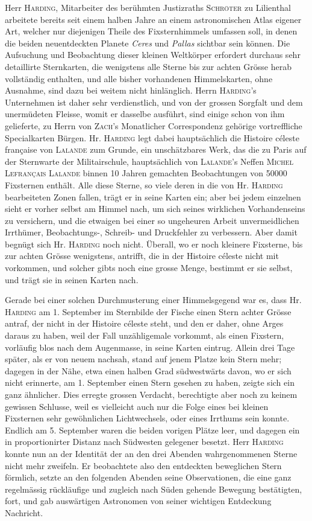 Herr \textsc{Harding}, Mitarbeiter des berühmten Justizraths \textsc{Schröter} zu Lilienthal arbeitete bereits seit einem halben Jahre an einem astronomischen Atlas eigener Art, welcher nur diejenigen Theile des Fixsternhimmels umfassen soll, in denen die beiden neuentdeckten Planete \emph{Ceres} und \emph{Pallas} sichtbar sein können. Die Aufsuchung und Beobachtung dieser kleinen Weltkörper erfordert durchaus sehr detaillirte Sternkarten, die wenigstens alle Sterne bis zur achten Grösse herab vollständig enthalten, und alle bisher vorhandenen Himmelskarten, ohne Ausnahme, sind dazu bei weitem nicht hinlänglich. Herrn \textsc{Harding}'s Unternehmen ist daher sehr verdienstlich, und von der grossen Sorgfalt und dem unermüdeten Fleisse, womit er dasselbe ausführt, sind einige schon von ihm gelieferte, zu Herrn von \textsc{Zach}'s Monatlicher Correspondenz gehörige vortreffliche Specialkarten Bürgen. Hr. \textsc{Harding} legt dabei hauptsächlich die Histoire céleste française von \textsc{Lalande} zum Grunde, ein unschätzbares Werk, das die zu Paris auf der Sternwarte der Militairschule,
 hauptsächlich von \textsc{Lalande}'s Neffen \textsc{Michel Lefrançais Lalande} binnen 10 Jahren gemachten Beobachtungen von 50000 Fixsternen enthält. Alle diese Sterne, so viele deren in die von Hr. \textsc{Harding} bearbeiteten Zonen fallen, trägt er in seine Karten ein; aber bei jedem einzelnen sieht er vorher selbst am Himmel nach, um sich seines wirklichen Vorhandenseins zu versichern, und die etwaigen bei einer so ungeheuren Arbeit unvermeidlichen Irrthümer, Beobachtungs-, Schreib- und Druckfehler zu verbessern. Aber damit begnügt sich Hr. \textsc{Harding} noch nicht. Überall, wo er noch kleinere Fixsterne, bis zur achten Grösse wenigstens, antrifft, die in der Histoire céleste nicht mit vorkommen, und solcher gibts noch eine grosse Menge, bestimmt er sie selbst, und trägt sie in seinen Karten nach.

Gerade bei einer solchen Durchmusterung einer Himmelsgegend war es, dass Hr. \textsc{Harding} am 1. September im Sternbilde der Fische einen Stern achter Grösse antraf, der nicht in der Histoire céleste steht, und den er daher, ohne Arges daraus zu haben, weil der Fall unzähligemale vorkommt, als einen Fixstern, vorläufig blos nach dem Augenmasse, in seine Karten eintrug. Allein drei Tage später, als er von neuem nachsah, stand auf jenem Platze kein Stern mehr; dagegen in der Nähe, etwa einen halben Grad südwestwärts davon, wo er sich nicht erinnerte, am 1. September einen Stern gesehen zu haben, zeigte sich ein ganz ähnlicher. Dies erregte grossen Verdacht, berechtigte aber noch zu keinem gewissen Schlusse, weil es vielleicht auch nur die Folge eines bei kleinen Fixsternen sehr gewöhnlichen Lichtwechsels, oder eines Irrthums sein konnte. Endlich am 5. September waren die beiden vorigen Plätze leer, und dagegen ein in proportionirter Distanz nach Südwesten gelegener besetzt. Herr \textsc{Harding} konnte nun an der Identität der an den drei Abenden wahrgenommenen Sterne nicht mehr zweifeln. Er beobachtete also den entdeckten beweglichen Stern förmlich, setzte an den folgenden Abenden seine Observationen, die eine ganz regelmässig rückläufige und zugleich nach Süden gehende Bewegung bestätigten, fort, und gab auswärtigen Astronomen von seiner wichtigen Entdeckung Nachricht.

